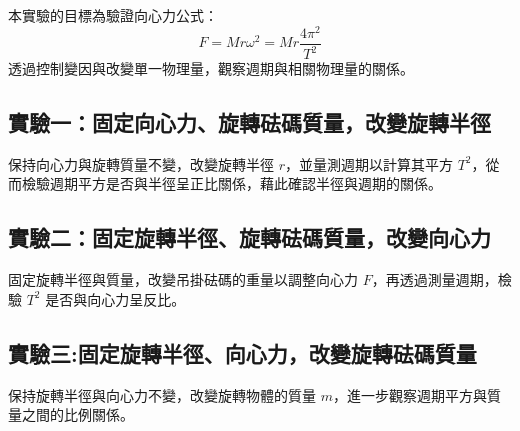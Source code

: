 \documentclass[12pt]{article}
\begin{document}
\noindent
本實驗的目標為驗證向心力公式：
\[
F = Mr\omega^2=Mr\frac{4\pi^2}{T^2}
\]
透過控制變因與改變單一物理量，觀察週期與相關物理量的關係。

\subsection{\textbf{實驗一}：固定向心力、旋轉砝碼質量，改變旋轉半徑}
    保持向心力與旋轉質量不變，改變旋轉半徑 $r$，並量測週期以計算其平方 $T^2$，從而檢驗週期平方是否與半徑呈正比關係，藉此確認半徑與週期的關係。

\subsection{\textbf{實驗二}：固定旋轉半徑、旋轉砝碼質量，改變向心力}
    固定旋轉半徑與質量，改變吊掛砝碼的重量以調整向心力 $F$，再透過測量週期，檢驗 $T^2$ 是否與向心力呈反比。

\subsection{\textbf{實驗三}:固定旋轉半徑、向心力，改變旋轉砝碼質量}
    保持旋轉半徑與向心力不變，改變旋轉物體的質量 $m$，進一步觀察週期平方與質量之間的比例關係。
\end{document}
